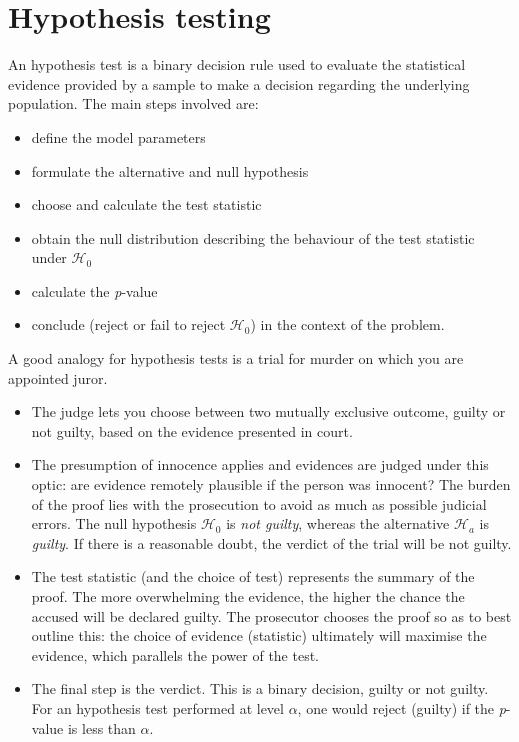 \documentclass[
  11pt,
  letterpaper,
]{book}
\providecommand{\tightlist}{%
  \setlength{\itemsep}{0pt}\setlength{\parskip}{0pt}}
\theoremstyle{definition}
\theoremstyle{definition}
\theoremstyle{definition}
\theoremstyle{remark}
\begin{document}
\hypertarget{tests}{%
\section{Hypothesis testing}\label{tests}}

An hypothesis test is a binary decision rule used to evaluate the statistical evidence provided by a sample to make a decision regarding the underlying population. The main steps involved are:

\begin{itemize}
\tightlist
\item
  define the model parameters
\item
  formulate the alternative and null hypothesis
\item
  choose and calculate the test statistic
\item
  obtain the null distribution describing the behaviour of the test statistic under \(\mathscr{H}_0\)
\item
  calculate the \emph{p}-value
\item
  conclude (reject or fail to reject \(\mathscr{H}_0\)) in the context of the problem.
\end{itemize}

A good analogy for hypothesis tests is a trial for murder on which you are appointed juror.

\begin{itemize}
\tightlist
\item
  The judge lets you choose between two mutually exclusive outcome, guilty or not guilty, based on the evidence presented in court.
\item
  The presumption of innocence applies and evidences are judged under this optic: are evidence remotely plausible if the person was innocent? The burden of the proof lies with the prosecution to avoid as much as possible judicial errors. The null hypothesis \(\mathscr{H}_0\) is \emph{not guilty}, whereas the alternative \(\mathscr{H}_a\) is \emph{guilty}. If there is a reasonable doubt, the verdict of the trial will be not guilty.
\item
  The test statistic (and the choice of test) represents the summary of the proof. The more overwhelming the evidence, the higher the chance the accused will be declared guilty. The prosecutor chooses the proof so as to best outline this: the choice of evidence (statistic) ultimately will maximise the evidence, which parallels the power of the test.
\item
  The final step is the verdict. This is a binary decision, guilty or not guilty. For an hypothesis test performed at level \(\alpha\), one would reject (guilty) if the \emph{p}-value is less than \(\alpha\).
\end{itemize}
\end{document}
